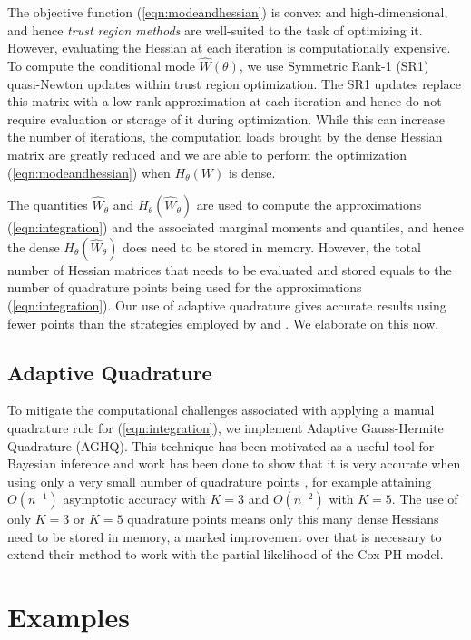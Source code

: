 \documentclass[ba]{imsart}
\begin{document}
The objective function (\ref{eqn:modeandhessian}) is convex and high-dimensional, and hence \emph{trust region methods} \citep{trustoptim} are well-suited to the task of optimizing it. However, evaluating the Hessian at each iteration is computationally expensive. To compute the conditional mode $\hat{W}(\theta)$, we use Symmetric Rank-1 (SR1) quasi-Newton updates within trust region optimization. The SR1 updates replace this matrix with a low-rank approximation at each iteration and hence do not require evaluation or storage of it during optimization. While this can increase the number of iterations, the computation loads brought by the dense Hessian matrix are greatly reduced and we are able to perform the optimization (\ref{eqn:modeandhessian}) when $H_{\theta}(W)$ is dense. 

The quantities $\widehat{W}_{\theta}$ and $H_{\theta}(\widehat{W}_{\theta})$ are used to compute the approximations (\ref{eqn:integration}) and the associated marginal moments and quantiles, and hence the dense $H_{\theta}(\widehat{W}_{\theta})$ does need to be stored in memory. However, the total number of Hessian matrices that needs to be evaluated and stored equals to the number of quadrature points being used for the approximations (\ref{eqn:integration}). Our use of adaptive quadrature gives accurate results using fewer points than the strategies employed by \cite{casecross} and \cite{inlacoxph}. We elaborate on this now.

\subsection{Adaptive Quadrature}

To mitigate the computational challenges associated with applying a manual quadrature rule for (\ref{eqn:integration}), we implement Adaptive Gauss-Hermite Quadrature (AGHQ). This technique has been motivated as a useful tool for Bayesian inference \citep{nayloradaptive} and work has been done to show that it is very accurate when using only a very small number of quadrature points \citep{adaptive_GH_1994,adaptive_GH_2020}, for example attaining $O(n^{-1})$ asymptotic accuracy with $K = 3$ and $O(n^{-2})$ with $K = 5$. The use of only $K = 3$ or $K = 5$ quadrature points means only this many dense Hessians need to be stored in memory, a marked improvement over \cite{casecross} that is necessary to extend their method to work with the partial likelihood of the Cox PH model.

\section{Examples}\label{sec:example}
\end{document}

